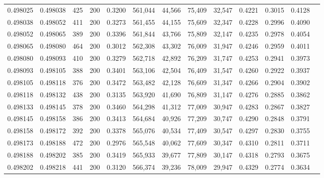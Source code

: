 \begin{tabular}{rrrrrrrrrrrrr}
0.498025 & 0.498038 &    425 & 200 &                                     0.3200 & 561,044 &  44,566 &  75,409 &  32,547 & 0.4221 & 0.3015 & 0.4128 \\
0.498038 & 0.498052 &    411 & 200 &                                     0.3273 & 561,455 &  44,155 &  75,609 &  32,347 & 0.4228 & 0.2996 & 0.4090 \\
0.498052 & 0.498065 &    389 & 200 &                                     0.3396 & 561,844 &  43,766 &  75,809 &  32,147 & 0.4235 & 0.2978 & 0.4054 \\
0.498065 & 0.498080 &    464 & 200 &                                     0.3012 & 562,308 &  43,302 &  76,009 &  31,947 & 0.4246 & 0.2959 & 0.4011 \\
0.498080 & 0.498093 &    410 & 200 &                                     0.3279 & 562,718 &  42,892 &  76,209 &  31,747 & 0.4253 & 0.2941 & 0.3973 \\
0.498093 & 0.498105 &    388 & 200 &                                     0.3401 & 563,106 &  42,504 &  76,409 &  31,547 & 0.4260 & 0.2922 & 0.3937 \\
0.498105 & 0.498118 &    376 & 200 &                                     0.3472 & 563,482 &  42,128 &  76,609 &  31,347 & 0.4266 & 0.2904 & 0.3902 \\
0.498118 & 0.498132 &    438 & 200 &                                     0.3135 & 563,920 &  41,690 &  76,809 &  31,147 & 0.4276 & 0.2885 & 0.3862 \\
0.498133 & 0.498145 &    378 & 200 &                                     0.3460 & 564,298 &  41,312 &  77,009 &  30,947 & 0.4283 & 0.2867 & 0.3827 \\
0.498145 & 0.498158 &    386 & 200 &                                     0.3413 & 564,684 &  40,926 &  77,209 &  30,747 & 0.4290 & 0.2848 & 0.3791 \\
0.498158 & 0.498172 &    392 & 200 &                                     0.3378 & 565,076 &  40,534 &  77,409 &  30,547 & 0.4297 & 0.2830 & 0.3755 \\
0.498173 & 0.498188 &    472 & 200 &                                     0.2976 & 565,548 &  40,062 &  77,609 &  30,347 & 0.4310 & 0.2811 & 0.3711 \\
0.498188 & 0.498202 &    385 & 200 &                                     0.3419 & 565,933 &  39,677 &  77,809 &  30,147 & 0.4318 & 0.2793 & 0.3675 \\
0.498202 & 0.498218 &    441 & 200 &                                     0.3120 & 566,374 &  39,236 &  78,009 &  29,947 & 0.4329 & 0.2774 & 0.3634 \\

\end{tabular}

